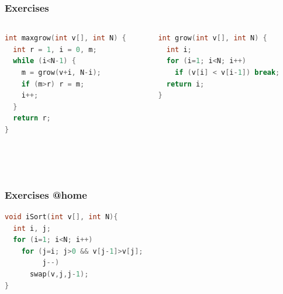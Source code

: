 \documentclass[aspectratio=169]{beamer}
\begin{document}
\begin{frame}[fragile]\frametitle{Exercises}
\begin{columns}
\begin{column}{0.48\textwidth}
\begin{lstlisting}[language=C++,emph={maxgrow,grow}]
int maxgrow(int v[], int N) {
  int r = 1, i = 0, m;
  while (i<N-1) {
    m = grow(v+i, N-i);
    if (m>r) r = m;
    i++;
  }
  return r;
}
\end{lstlisting}
\end{column}
\begin{column}{0.48\textwidth}
\begin{lstlisting}[language=C++,emph={grow}]
int grow(int v[], int N) {
  int i;
  for (i=1; i<N; i++)
    if (v[i] < v[i-1]) break;
  return i;
}

\end{lstlisting}
\end{column}
\end{columns}

~\\[-6mm]
~\\[-11mm]

\end{frame}

\begin{frame}[fragile]\frametitle{Exercises @home}
\centering

\begin{lstlisting}[language=C++,emph={iSort,swap}]
void iSort(int v[], int N){
  int i, j;
  for (i=1; i<N; i++)
    for (j=i; j>0 && v[j-1]>v[j];
         j--)
      swap(v,j,j-1);
}
\end{lstlisting}

\end{frame}
\end{document}
